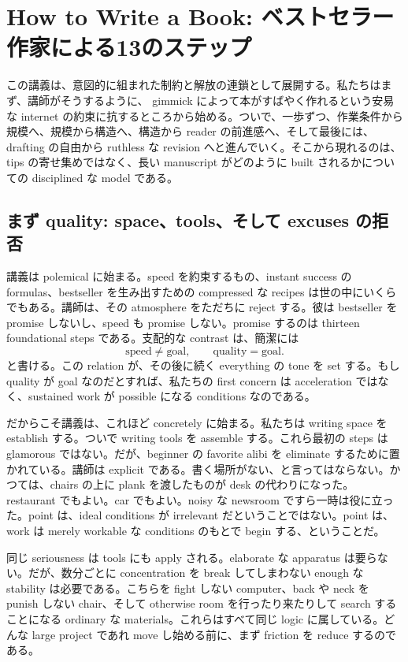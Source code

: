 \chapter{How to Write a Book: ベストセラー作家による13のステップ}

この講義は、意図的に組まれた制約と解放の連鎖として展開する。私たちはまず、講師がそうするように、 gimmick によって本がすばやく作れるという安易な internet の約束に抗するところから始める。ついで、一歩ずつ、作業条件から規模へ、規模から構造へ、構造から reader の前進感へ、そして最後には、drafting の自由から ruthless な revision へと進んでいく。そこから現れるのは、tips の寄せ集めではなく、長い manuscript がどのように built されるかについての disciplined な model である。

\section{まず quality: space、tools、そして excuses の拒否}

講義は polemical に始まる。speed を約束するもの、instant success の formulas、bestseller を生み出すための compressed な recipes は世の中にいくらでもある。講師は、その atmosphere をただちに reject する。彼は bestseller を promise しないし、speed も promise しない。promise するのは thirteen foundational steps である。支配的な contrast は、簡潔には
\begin{equation}
\text{speed} \neq \text{goal}, \qquad \text{quality} = \text{goal}.
\end{equation}
と書ける。この relation が、その後に続く everything の tone を set する。もし quality が goal なのだとすれば、私たちの first concern は acceleration ではなく、sustained work が possible になる conditions なのである。

だからこそ講義は、これほど concretely に始まる。私たちは writing space を establish する。ついで writing tools を assemble する。これら最初の steps は glamorous ではない。だが、beginner の favorite alibi を eliminate するために置かれている。講師は explicit である。書く場所がない、と言ってはならない。かつては、chairs の上に plank を渡したものが desk の代わりになった。restaurant でもよい。car でもよい。noisy な newsroom ですら一時は役に立った。point は、ideal conditions が irrelevant だということではない。point は、work は merely workable な conditions のもとで begin する、ということだ。

同じ seriousness は tools にも apply される。elaborate な apparatus は要らない。だが、数分ごとに concentration を break してしまわない enough な stability は必要である。こちらを fight しない computer、back や neck を punish しない chair、そして otherwise room を行ったり来たりして search することになる ordinary な materials。これらはすべて同じ logic に属している。どんな large project であれ move し始める前に、まず friction を reduce するのである。

